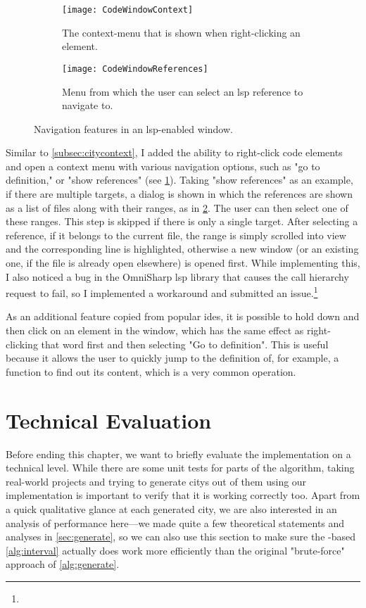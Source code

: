 \documentclass[../thesis]{subfiles}
\begin{document}
\begin{figure}
	\centering
	\begin{subfigure}{0.47\textwidth}
		\texttt{[image: CodeWindowContext]}
		\caption{The context-menu that is shown when right-clicking an element.}\label{fig:windowcontext}
	\end{subfigure}
	\begin{subfigure}{0.47\textwidth}
		\texttt{[image: CodeWindowReferences]}
		\caption{Menu from which the user can select an \gls{lsp} reference to navigate to.}\label{fig:windowmenu}
	\end{subfigure}
	\caption{Navigation features in an \gls{lsp}-enabled \gls{window}.}\label{fig:windownav}
\end{figure}


Similar to \cref{subsec:citycontext}, I added the ability to right-click code elements and open a context menu with various navigation options, such as "go to definition," or "show references" (see \cref{fig:windowcontext}).
Taking "show references" as an example, if there are multiple targets, a dialog is shown in which the references are shown as a list of files along with their ranges, as in \cref{fig:windowmenu}.
The user can then select one of these ranges.
This step is skipped if there is only a single target.
After selecting a reference, if it belongs to the current file, the range is simply scrolled into view and the corresponding line is highlighted, otherwise a new \gls{window} (or an existing one, if the file is already open elsewhere) is opened first.
While implementing this, I also noticed a bug in the OmniSharp \gls{lsp} library that causes the call hierarchy request to fail, so I implemented a workaround and submitted an issue.\footnote{
}

As an additional feature copied from popular \glspl{ide}, it is possible to hold down  and then click on an element in the \gls{window}, which has the same effect as right-clicking that word first and then selecting "Go to definition".
This is useful because it allows the user to quickly jump to the definition of, for example, a function to find out its content, which is a very common operation.

\section{Technical Evaluation}\label{sec:techeval}
Before ending this chapter, we want to briefly evaluate the implementation on a technical level.
While there are some unit tests for parts of the algorithm, taking real-world projects and trying to generate \glspl{city} out of them using our implementation is important to verify that it is working correctly too.
Apart from a quick qualitative glance at each generated city, we are also interested in an analysis of performance here---we made quite a few theoretical statements and analyses in \cref{sec:generate}, so we can also use this section to make sure the -based \cref{alg:interval} actually does work more efficiently than the original "brute-force" approach of \cref{alg:generate}.
\end{document}
